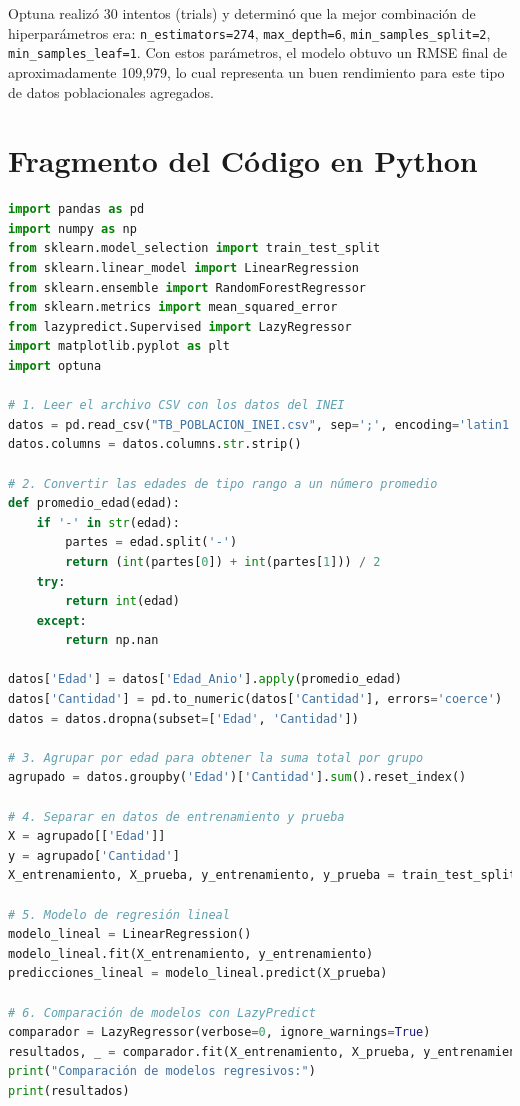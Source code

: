 \documentclass[a4paper,10pt]{article}
\begin{document}
Optuna realizó 30 intentos (trials) y determinó que la mejor combinación de hiperparámetros era: \texttt{n\_estimators=274}, \texttt{max\_depth=6}, \texttt{min\_samples\_split=2}, \texttt{min\_samples\_leaf=1}. Con estos parámetros, el modelo obtuvo un RMSE final de aproximadamente 109,979, lo cual representa un buen rendimiento para este tipo de datos poblacionales agregados.

\section*{Fragmento del Código en Python}

\begin{lstlisting}[language=Python]
import pandas as pd
import numpy as np
from sklearn.model_selection import train_test_split
from sklearn.linear_model import LinearRegression
from sklearn.ensemble import RandomForestRegressor
from sklearn.metrics import mean_squared_error
from lazypredict.Supervised import LazyRegressor
import matplotlib.pyplot as plt
import optuna

# 1. Leer el archivo CSV con los datos del INEI
datos = pd.read_csv("TB_POBLACION_INEI.csv", sep=';', encoding='latin1')
datos.columns = datos.columns.str.strip()

# 2. Convertir las edades de tipo rango a un número promedio
def promedio_edad(edad):
    if '-' in str(edad):
        partes = edad.split('-')
        return (int(partes[0]) + int(partes[1])) / 2
    try:
        return int(edad)
    except:
        return np.nan

datos['Edad'] = datos['Edad_Anio'].apply(promedio_edad)
datos['Cantidad'] = pd.to_numeric(datos['Cantidad'], errors='coerce')
datos = datos.dropna(subset=['Edad', 'Cantidad'])

# 3. Agrupar por edad para obtener la suma total por grupo
agrupado = datos.groupby('Edad')['Cantidad'].sum().reset_index()

# 4. Separar en datos de entrenamiento y prueba
X = agrupado[['Edad']]
y = agrupado['Cantidad']
X_entrenamiento, X_prueba, y_entrenamiento, y_prueba = train_test_split(X, y, test_size=0.2, random_state=42)

# 5. Modelo de regresión lineal
modelo_lineal = LinearRegression()
modelo_lineal.fit(X_entrenamiento, y_entrenamiento)
predicciones_lineal = modelo_lineal.predict(X_prueba)

# 6. Comparación de modelos con LazyPredict
comparador = LazyRegressor(verbose=0, ignore_warnings=True)
resultados, _ = comparador.fit(X_entrenamiento, X_prueba, y_entrenamiento, y_prueba)
print("Comparación de modelos regresivos:")
print(resultados)


\end{lstlisting}
\end{document}
